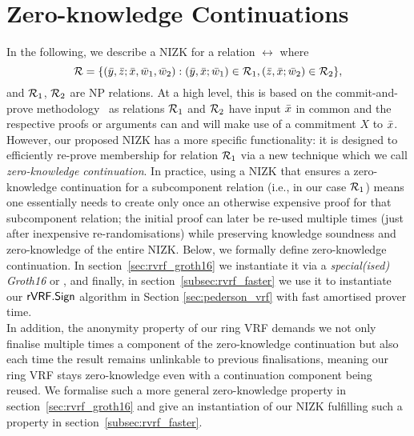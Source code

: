 


\section{Zero-knowledge Continuations}
\label{sec:rvrf_cont}

\noindent In the following, we describe a NIZK for a relation $\rel$ where
$$\mathcal{R} = \{(\bar{y}, \bar{z}; \bar{x}, \bar{w}_1, \bar{w}_2):  (\bar{y}, \bar{x}; \bar{w}_1) \in \mathcal{R}_1, (\bar{z}, \bar{x}; \bar{w}_2) \in \mathcal{R}_2 \},$$
and $\mathcal{R}_1$, $\mathcal{R}_2$ are NP relations. 
At a high level, this is based on the commit-and-prove methodology~\cite{Kilian1990UsesOR,CLOS02,LegoSNARK} 
as relations $\mathcal{R}_1$ and $\mathcal{R}_2$ have input $\bar{x}$ in common and the respective 
proofs or arguments can and will make use of a commitment $X$ to $\bar{x}$. However, our proposed NIZK has a more specific functionality: 
it is designed to efficiently re-prove membership for relation $\mathcal{R}_1$ via a new technique which we call \emph{zero-knowledge continuation}. 
In practice, using a NIZK that ensures a zero-knowledge continuation for a 
subcomponent relation (i.e., in our case $\mathcal{R}_1$) means one essentially needs to create only once an otherwise expensive proof for that subcomponent 
relation; the initial proof can later be re-used multiple times (just after inexpensive re-randomisations) 
while preserving knowledge soundness and zero-knowledge of the entire NIZK. 
Below, we formally define zero-knowledge continuation. In section~\ref{sec:rvrf_groth16} we instantiate it via a \emph{special(ised) 
Groth16} or \SpecialG, and finally, in section~\ref{subsec:rvrf_faster} we use it to instantiate our $ {\mathsf{rVRF}}.{\mathsf{Sign}} $ algorithm in Section \ref{sec:pederson_vrf} with fast amortised prover time. \\

\noindent In addition, the anonymity property of our ring VRF demands we not only finalise multiple times a component of the zero-knowledge 
continuation but also each time the result remains unlinkable to previous finalisations, meaning our ring VRF stays zero-knowledge 
even with a continuation component being reused. We formalise such a more general zero-knowledge property in 
section~\ref{sec:rvrf_groth16} and give an instantiation of our NIZK fulfilling such a property in section~\ref{subsec:rvrf_faster}. 


